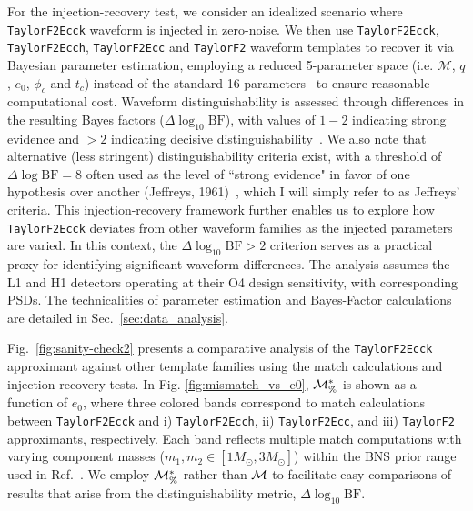 \documentclass[aps,prd,twocolumn,superscriptaddress,groupedaddress,nofootinbib,showpacs,eqsecnum,useAms]{revtex4-2}
\begin{document}
For the injection-recovery test, we consider an idealized scenario where \texttt{TaylorF2Ecck} waveform is injected in zero-noise. We then use \texttt{TaylorF2Ecck}, \texttt{TaylorF2Ecch}, \texttt{TaylorF2Ecc} and \texttt{TaylorF2} waveform templates to recover it via Bayesian parameter estimation, employing a reduced 5-parameter space (i.e. $\mathcal{M}$, $q$, $e_0$, $\phi_c$ and $t_c$) instead of the standard 16 parameters~\cite{bilby_paper} to ensure reasonable computational cost. 
Waveform distinguishability is assessed through differences in the resulting Bayes factors ($\Delta \log_{10} \text{BF}$), with values of $1-2$ indicating strong evidence and $>2$ indicating decisive distinguishability~\cite{Kass01061995}. 
We also note that alternative (less stringent) distinguishability criteria exist, with a threshold of $\Delta \log \text{BF}=8$ often used as the level of ``strong evidence" in favor of one hypothesis over another (Jeffreys, 1961)~\cite{Jeffreys1961}, which I will simply refer to as Jeffreys' criteria.
This injection-recovery framework further enables us to explore how \texttt{TaylorF2Ecck} deviates from other waveform families as the injected parameters are varied. In this context, the $\Delta \log_{10} \mathrm{BF} > 2$ criterion serves as a practical proxy for identifying significant waveform differences. The analysis assumes the L1 and H1 detectors operating at their O4 design sensitivity, with corresponding PSDs. The technicalities of parameter estimation and Bayes-Factor calculations are detailed in Sec.~\ref{sec:data_analysis}. 

Fig.~\ref{fig:sanity-check2} presents a comparative analysis of the \texttt{TaylorF2Ecck} approximant against other template families using the match calculations and injection-recovery tests. In Fig. \ref{fig:mismatch_vs_e0}, ${\cal M}^*_\%$ is shown as a function of $e_0$, where three colored bands correspond to match calculations between \texttt{TaylorF2Ecck} and i) \texttt{TaylorF2Ecch}, ii) \texttt{TaylorF2Ecc}, and iii) \texttt{TaylorF2} approximants, respectively. Each band reflects multiple match computations with varying component masses ($m_1, m_2 \in [1 M_{\odot}, 3 M_{\odot}] $) within the BNS prior range used in Ref.~\cite{LNB}.
We employ ${\cal M}^*_\%$ rather than ${\cal M}$ to facilitate easy comparisons
of results that arise from 
the distinguishability metric, $\Delta\log_{10}\text{BF}$.
\end{document}
